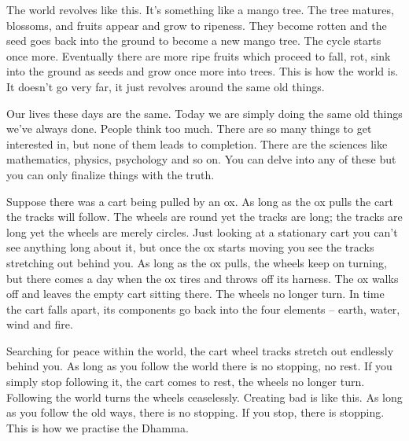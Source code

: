 The world revolves like this. It's something like a mango tree. The tree matures, blossoms, and fruits appear and grow to ripeness. They become rotten and the seed goes back into the ground to become a new mango tree. The cycle starts once more. Eventually there are more ripe fruits which proceed to fall, rot, sink into the ground as seeds and grow once more into trees. This is how the world is. It doesn't go very far, it just revolves around the same old things.

Our lives these days are the same. Today we are simply doing the same old things we've always done. People think too much. There are so many things to get interested in, but none of them leads to completion. There are the sciences like mathematics, physics, psychology and so on. You can delve into any of these but you can only finalize things with the truth.

Suppose there was a cart being pulled by an ox. As long as the ox pulls the cart the tracks will follow. The wheels are round yet the tracks are long; the tracks are long yet the wheels are merely circles. Just looking at a stationary cart you can't see anything long about it, but once the ox starts moving you see the tracks stretching out behind you. As long as the ox pulls, the wheels keep on turning, but there comes a day when the ox tires and throws off its harness. The ox walks off and leaves the empty cart sitting there. The wheels no longer turn. In time the cart falls apart, its components go back into the four elements -- earth, water, wind and fire.

Searching for peace within the world, the cart wheel tracks stretch out endlessly behind you. As long as you follow the world there is no stopping, no rest. If you simply stop following it, the cart comes to rest, the wheels no longer turn. Following the world turns the wheels ceaselessly. Creating bad  is like this. As long as you follow the old ways, there is no stopping. If you stop, there is stopping. This is how we practise the Dhamma.

